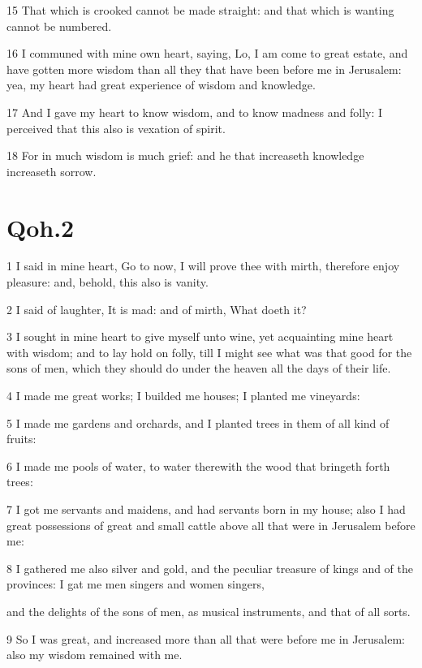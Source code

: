 \documentclass[12pt,twoside]{report}
\begin{document}
15 That which is crooked cannot be made straight: and that which
   is
   wanting cannot be numbered.
   
16 I communed with mine own heart, saying, Lo, I am come to great
   estate, and have gotten more wisdom than all they that have been
   before me in Jerusalem: yea, my heart had great experience of
   wisdom
   and knowledge.
   
17 And I gave my heart to know wisdom, and to know madness and
   folly: I perceived that this also is vexation of spirit.
   
18 For in much wisdom is much grief: and he that increaseth
   knowledge increaseth sorrow.

\section{Qoh.2}
   
   
1 I said in mine heart, Go to now, I will prove thee with mirth,
   therefore enjoy pleasure: and, behold, this also is vanity.
   
2 I said of laughter, It is mad: and of mirth, What doeth it?
   
3 I sought in mine heart to give myself unto wine, yet
   acquainting
   mine heart with wisdom; and to lay hold on folly, till I might see
   what was that good for the sons of men, which they should do under
   the
   heaven all the days of their life.
   
4 I made me great works; I builded me houses; I planted me
   vineyards:
   
5 I made me gardens and orchards, and I planted trees in them of
   all
   kind of fruits:
   
6 I made me pools of water, to water therewith the wood that
   bringeth forth trees:
   
7 I got me servants and maidens, and had servants born in my
   house;
   also I had great possessions of great and small cattle above all
   that
   were in Jerusalem before me:
   
8 I gathered me also silver and gold, and the peculiar treasure
   of
   kings and of the provinces: I gat me men singers and women singers,
   
   and the delights of the sons of men, as musical instruments, and
   that
   of all sorts. 
   
9 So I was great, and increased more than all that were before me
   in
   Jerusalem: also my wisdom remained with me.
   
\end{document}
